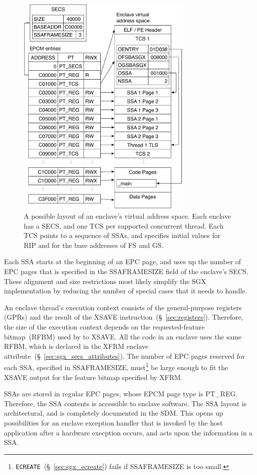 \begin{figure}[hbt]
  \centering
  \includegraphics[width=85mm]{figures/sgx_enclave_layout.pdf}
  \caption{
    A possible layout of an enclave's virtual address space. Each enclave has a
    SECS, and one TCS per supported concurrent thread. Each TCS points to a
    sequence of SSAs, and specifies initial values for RIP and for the base
    addresses of FS and GS.
  }
  \label{fig:sgx_enclave_layout}
\end{figure}

Each SSA starts at the beginning of an EPC page, and uses up the number of EPC
pages that is specified in the SSAFRAMESIZE field of the enclave's SECS. These
alignment and size restrictions most likely simplify the SGX implementation by
reducing the number of special cases that it needs to handle.


An enclave thread's execution context consists of the general-purpose registers
(GPRs) and the result of the XSAVE instruction~(\S~\ref{sec:registers}).
Therefore, the size of the execution context depends on the requested-feature
bitmap~(RFBM) used by to XSAVE. All the code in an enclave uses the same RFBM,
which is declared in the XFRM enclave
attribute~(\S~\ref{sec:sgx_secs_attributes}). The number of EPC pages reserved
for each SSA, specified in SSAFRAMESIZE,
must\footnote{\texttt{ECREATE}~(\S~\ref{sec:sgx_ecreate}) fails if SSAFRAMESIZE
is too small.} be large enough to fit the XSAVE output for the feature bitmap
specified by XFRM.

SSAs are stored in regular EPC pages, whose EPCM page type is PT\_REG.
Therefore, the SSA contents is accessible to enclave software. The SSA layout
is architectural, and is completely documented in the SDM. This opens up
possibilities for an enclave exception handler that is invoked by the host
application after a hardware execption occurs, and acts upon the information in
a SSA.
